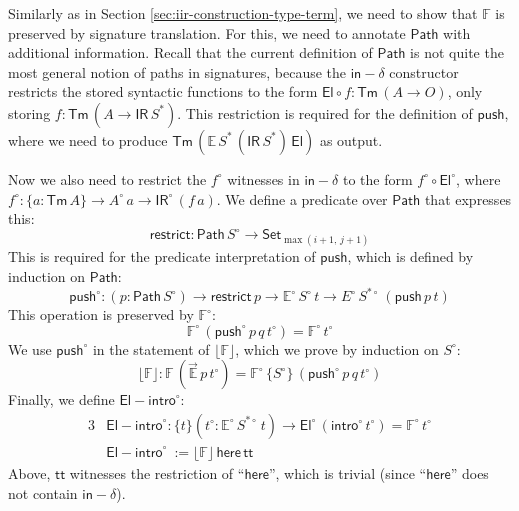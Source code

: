 \documentclass[acmsmall,screen,review]{acmart}
\newcommand{\msf}[1]{{\mathsf{#1}}}
\newcommand{\mbb}[1]{\mathbb{#1}}
\newcommand{\push}{\mathsf{push}}
\newcommand{\Set}{\msf{Set}}
\newcommand{\El}{\msf{El}}
\newcommand{\ttt}{\msf{tt}}
\newcommand{\IR}{\msf{IR}}
\newcommand{\intro}{\msf{intro}}
\newcommand{\floord}[1]{\lfloor #1 \rfloor}
\newcommand{\ora}[1]{\overrightarrow{#1}}
\newcommand{\Tm}{\msf{Tm}}
\newcommand{\w}{\circ}
\newcommand{\Path}{\msf{Path}}
\newcommand{\here}{\msf{here}}
\newcommand{\indelta}{\msf{in}\!\!-\!\!\delta}
\newcommand{\Elintro}{\msf{El\!\!-\!\!intro}}
\newcommand{\E}{\mbb{E}}
\newcommand{\F}{\mbb{F}}
\begin{document}
\begin{definition}[Interpretation of $\Elintro$]\label{sec:canonicity-elintro}
Similarly as in Section \ref{sec:iir-construction-type-term}, we need to show that $\F$ is preserved
by signature translation. For this, we need to annotate $\Path$ with additional information. Recall
that the current definition of $\Path$ is not quite the most general notion of paths in signatures,
because the $\indelta$ constructor restricts the stored syntactic functions to the form $\El \circ f
: \Tm\,(A \to O)$, only storing $f : \Tm\,(A \to \IR\,S^*)$. This restriction is required for the
definition of $\push$, where we need to produce $\Tm\,(\E\,S^*\,(\IR\,S^*)\,\El)$ as output.

Now we also need to restrict the $f^\w$ witnesses in $\indelta$ to the form $f^\w \circ \El^\w$,
where $f^\w : \{a : \Tm\,A\} \to A^\w\,a \to \IR^\w\,(f\,a)$. We define a predicate over $\Path$
that expresses this:
\[ \msf{restrict} : \Path\,S^\w \to \Set_{\max(i+1,\,j+1)} \]
This is required for the predicate interpretation of $\push$, which is defined by induction on $\Path$:
\[ \push^\w : (p : \Path\,S^\w) \to \msf{restrict}\,p \to \E^\w\,S^\w\,t \to E^\w\,S^{*\w}\,(\push\,p\,t) \]
This operation is preserved by $\F^\w$:
\[ \F^\w\,(\push^\w\,p\,q\,t^\w) = \F^\w\,t^\w \]
We use $\push^\w$ in the statement of $\floord{\F}$, which we prove by induction on
$S^\w$:
\[ \floord{\F} : \F\,(\ora{\E}\,p\,t^\w) = \F^\w\,\{S^\w\}\,(\push^\w\,p\,q\,t^\w) \]
Finally, we define $\Elintro^\w$:
\begin{alignat*}{3}
    &\Elintro^\w : \{t\}(t^\w : \E^\w\,S^{*\w}\,t) \to \El^\w\,(\intro^\w\,t^\w) = \F^\w\,t^\w\\
    &\Elintro^\w\ := \floord{\F}\,\here\,\ttt
\end{alignat*}
Above, $\ttt$ witnesses the restriction of ``$\here$'', which is trivial (since ``$\here$'' does not contain $\indelta$).
\end{definition}
\end{document}
